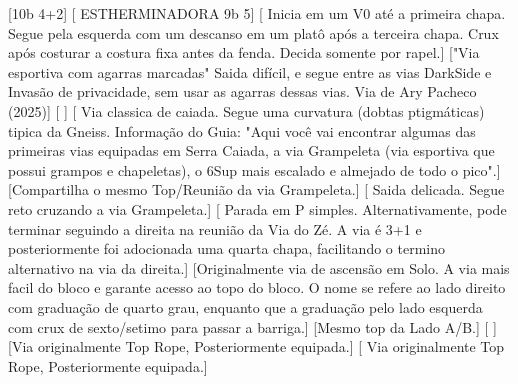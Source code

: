 
\begin{CGSectorRoutes}
    [10b 4+2]
    [ ESTHERMINADORA 9b 5]
    [ Inicia em um V0 até a primeira chapa.
Segue pela esquerda com um descanso em um platô após a terceira chapa. 
Crux após costurar a costura fixa antes da fenda. 
Decida somente por rapel.]
    ["Via esportiva com agarras marcadas"
Saida difícil, e segue entre as vias DarkSide e Invasão de privacidade, sem usar as agarras dessas vias. Via de Ary Pacheco (2025)]
    [ ]
    [ Via classica de caiada. Segue uma curvatura (dobtas ptigmáticas) tipica da Gneiss. Informação do Guia: "Aqui você vai encontrar algumas das primeiras vias equipadas em Serra
Caiada, a via Grampeleta (via esportiva que possui grampos e chapeletas),
o 6Sup mais escalado e almejado de
todo o pico".]
    [Compartilha o mesmo Top/Reunião da via Grampeleta.]
    [ Saida delicada. Segue reto cruzando a via Grampeleta.]
    [ Parada em P simples. Alternativamente, pode terminar seguindo a direita na reunião da Via do Zé. A via é 3+1 e posteriormente foi adocionada uma quarta chapa, facilitando o termino alternativo na via da direita.]
    [Originalmente via de ascensão em Solo. A via mais facil do bloco e garante acesso ao topo do bloco. O nome se refere ao lado direito com graduação de quarto grau, enquanto que a graduação pelo lado esquerda com crux de sexto/setimo para passar a barriga.]
    [Mesmo top da Lado A/B.]
    [ ]
    [Via originalmente Top Rope, Posteriormente equipada.]
    [ Via originalmente Top Rope, Posteriormente equipada.]
\end{CGSectorRoutes}

